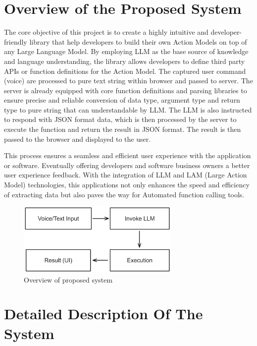 \section{Overview of the Proposed System}

\noindent The core objective of this project is to create a highly intuitive and developer-friendly library that help developers to build their own Action Models on top of any Large Language Model. By employing LLM as the base source of knowledge and language understanding, the library allows developers to define third party APIs or function definitions for the Action Model. The captured user command (voice) are processed to pure text string within browser and passed to server. The server is already equipped with core function definitions and parsing libraries to ensure precise and reliable conversion of data type, argument type and return type to pure string that can understandable by LLM. The LLM is also instructed to respond with JSON format data, which is then processed by the server to execute the function and return the result in JSON format. The result is then passed to the browser and displayed to the user.

\noindent This process ensures a seamless and efficient user experience with the application or software. Eventually offering developers and software business owners a better user experience feedback. With the integration of LLM and LAM (Large Action Model) technologies, this applications not only enhances the speed and efficiency of extracting data but also paves the way for Automated function calling tools.

\begin{figure}[htbp]
  \centering
  \includegraphics[width=0.7\textwidth]{Images/prop_sys/overview_prop_sys.png}
  \caption{Overview of proposed system}
\end{figure}

\section{Detailed Description Of The System}


